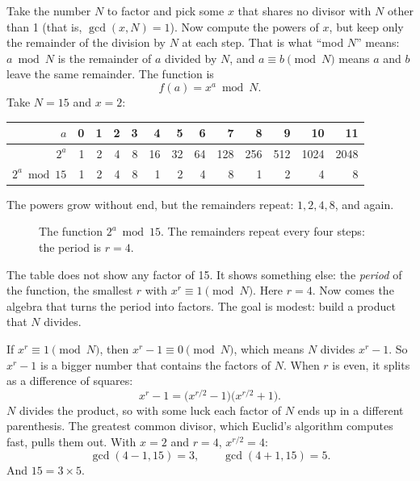 Take the number $N$ to factor and pick some $x$ that shares no divisor with $N$
other than 1 (that is, $\gcd(x, N) = 1$). Now compute the powers of $x$, but
keep only the remainder of the division by $N$ at each step. That is what
``mod $N$'' means: $a \bmod N$ is the remainder of $a$ divided by $N$, and
$a \equiv b \pmod N$ means $a$ and $b$ leave the same remainder. The function is
\[
  f(a) = x^a \bmod N .
\]
Take $N = 15$ and $x = 2$:

\begin{center}
\begin{tabular}{r|rrrrrrrrrrrr}
$a$ & 0 & 1 & 2 & 3 & 4 & 5 & 6 & 7 & 8 & 9 & 10 & 11 \\
\hline
$2^a$ & 1 & 2 & 4 & 8 & 16 & 32 & 64 & 128 & 256 & 512 & 1024 & 2048 \\
$2^a \bmod 15$ & 1 & 2 & 4 & 8 & 1 & 2 & 4 & 8 & 1 & 2 & 4 & 8 \\
\end{tabular}
\end{center}

The powers grow without end, but the remainders repeat: $1, 2, 4, 8$, and again.

\begin{figure}[htbp]
\centering
{}
\caption{The function $2^a \bmod 15$. The remainders repeat every four steps:
the period is $r = 4$.}
\end{figure}

The table does not show any factor of 15. It shows something else: the
\emph{period} of the function, the smallest $r$ with $x^r \equiv 1 \pmod N$.
Here $r = 4$. Now comes the algebra that turns the period into factors. The
goal is modest: build a product that $N$ divides.

If $x^r \equiv 1 \pmod N$, then $x^r - 1 \equiv 0 \pmod N$, which means $N$
divides $x^r - 1$. So $x^r - 1$ is a bigger number that contains the factors of
$N$. When $r$ is even, it splits as a difference of squares:
\[
  x^r - 1 = \big(x^{r/2} - 1\big)\big(x^{r/2} + 1\big).
\]
$N$ divides the product, so with some luck each factor of $N$ ends up in a
different parenthesis. The greatest common divisor, which Euclid's algorithm
computes fast, pulls them out. With $x = 2$ and $r = 4$, $x^{r/2} = 4$:
\[
  \gcd(4 - 1, 15) = 3, \qquad \gcd(4 + 1, 15) = 5 .
\]
And $15 = 3 \times 5$.

